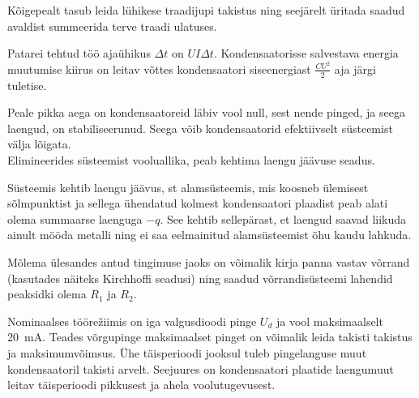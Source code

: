 \documentclass[10pt]{article}
\begin{document}
{%

\hint
Kõigepealt tasub leida lühikese traadijupi takistus ning seejärelt üritada saadud avaldist summeerida terve traadi ulatuses.
\probend
\bigskip


\hint
Patarei tehtud töö ajaühikus $\Delta t$ on $UI\Delta t$. Kondensaatorisse salvestava energia muutumise kiirus on leitav võttes kondensaatori siseenergiast $\frac{CU^2}{2}$ aja järgi tuletise.
\probend
\bigskip


\hint
\osa\osa Peale pikka aega on kondensaatoreid läbiv vool null, sest nende pinged, ja seega laengud, on stabiliseerunud. Seega võib kondensaatorid efektiivselt süsteemist välja lõigata.\\
\osa Elimineerides süsteemist vooluallika, peab kehtima laengu jäävuse seadus.
\probend
\bigskip


\hint
Süsteemis kehtib laengu jäävus, st alamsüsteemis, mis koosneb ülemisest sõlmpunktist ja sellega ühendatud kolmest kondensaatori plaadist peab alati olema summaarse laenguga $-q$. See kehtib sellepärast, et laengud saavad liikuda ainult mööda metalli ning ei saa eelmainitud alamsüsteemist õhu kaudu lahkuda.
\probend
\bigskip


\hint
Mõlema ülesandes antud tingimuse jaoks on võimalik kirja panna vastav võrrand (kasutades näiteks Kirchhoffi seadusi) ning saadud võrrandisüsteemi lahendid peaksidki olema $R_1$ ja $R_2$.
\probend
\bigskip


\hint
Nominaalses töörežiimis on iga valgusdioodi pinge $U_d$ ja vool maksimaalselt \SI{20}{mA}. Teades võrgupinge maksimaalset pinget on võimalik leida takisti takistus ja maksimumvõimsus. Ühe täisperioodi jooksul tuleb pingelanguse muut kondensaatoril takisti arvelt. Seejuures on kondensaatori plaatide laengumuut leitav täisperioodi pikkusest ja ahela voolutugevusest.
\probend
\bigskip

}
\end{document}
